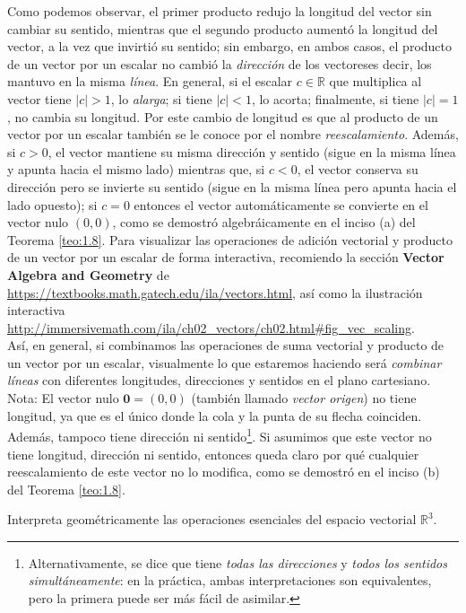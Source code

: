 \documentclass[apuntes]{subfiles}
\begin{document}
Como podemos observar, el primer producto redujo la longitud del vector sin cambiar su sentido, mientras que el segundo producto aumentó la longitud del vector, a la vez que invirtió su sentido; sin embargo, en ambos casos, el producto de un vector por un escalar no cambió la \emph{dirección} de los vectores\textemdash es decir, los mantuvo en la misma \emph{línea}. En general, si el escalar $c\in\mathbb{R}$ que multiplica al vector tiene $|c|>1$, lo \emph{alarga}; si tiene $|c|<1$, lo acorta; finalmente, si tiene $|c|=1$, no cambia su longitud. Por este cambio de longitud es que al producto de un vector por un escalar también se le conoce por el nombre \emph{reescalamiento}. Además, si $c>0$, el vector mantiene su misma dirección y sentido (sigue en la misma línea y apunta hacia el mismo lado) mientras que, si $c<0$, el vector conserva su dirección pero se invierte su sentido (sigue en la misma línea pero apunta hacia el lado opuesto); si $c=0$ entonces el vector automáticamente se convierte en el vector nulo $(0,0)$, como se demostró algebráicamente en el inciso (a) del Teorema \ref{teo:1.8}. Para visualizar las operaciones de adición vectorial y producto de un vector por un escalar de forma interactiva, recomiendo la sección \textbf{Vector Algebra and Geometry} de \url{https://textbooks.math.gatech.edu/ila/vectors.html}, así como la ilustración interactiva \url{http://immersivemath.com/ila/ch02_vectors/ch02.html#fig_vec_scaling}. \\

    Así, en general, si combinamos las operaciones de suma vectorial y producto de un vector por un escalar, visualmente lo que estaremos haciendo será \emph{combinar líneas} con diferentes longitudes, direcciones y sentidos en el plano cartesiano. \\

Nota: El vector nulo $\mathbf{0}=(0,0)$ (también llamado \emph{vector origen}) no tiene longitud, ya que es el único donde la cola y la punta de su flecha coinciden. Además, tampoco tiene dirección ni sentido\footnote{Alternativamente, se dice que tiene \emph{todas las direcciones} y \emph{todos los sentidos simultáneamente}: en la práctica, ambas interpretaciones son equivalentes, pero la primera puede ser más fácil de asimilar.}. Si asumimos que este vector no tiene longitud, dirección ni sentido, entonces queda claro por qué cualquier reescalamiento de este vector no lo modifica, como se demostró en el inciso (b) del Teorema \ref{teo:1.8}.

\begin{ejer}
    Interpreta geométricamente las operaciones esenciales del espacio vectorial $\mathbb{R}^3$.
\end{ejer}
\end{document}
